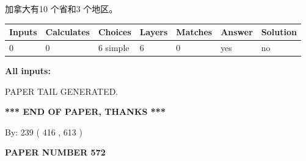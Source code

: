 \documentclass{ctexart}
\begin{document}
 
加拿大有10 个省和3 个地区。
 
 
\noindent{}
 
 
   
   
   
   
\noindent\begin{tabular}{|l|l|l|l|l|l|l|}
 \hline
Inputs & Calculates & Choices & Layers & Matches & Answer & Solution \\ \hline
 0  & 
 0  & 
 6
  simple  
  & 
 6  & 
 0  & 
  yes & 
  no 
  \\ \hline
 \end{tabular}
   
   
   
   
\noindent{}
   
   
   
   
\noindent\vspace{0.1in}\hspace{-0.08in} {\textbf{\Large{All inputs: }}}
   
   
   
   
   
   
 \vspace{0.2in}
 
   
   
\vspace{2.0in} PAPER TAIL GENERATED.
   
   
   
   
\vspace{1.0in} 
{\textbf{\large{ *** END OF PAPER, THANKS *** }}} 
   
   
\hspace{1.0in} By: 
 239 ( 416 ,  613 )
   
   
   
   
\newpage 
\setcounter{page}{ 
   572001 } 
   
   
   
   
 {\textbf{ \Large{ PAPER NUMBER  572  }}}
   
   
\vspace{0.2in}
   
   
   
   
   
   
   
\end{document}
